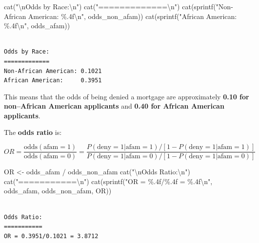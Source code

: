 \documentclass[
  12pt,
  letterpaper,
]{scrbook}
\newenvironment{Shaded}{\begin{snugshade}}{\end{snugshade}}
\newcommand{\FunctionTok}[1]{\textcolor[rgb]{0.28,0.35,0.67}{#1}}
\newcommand{\NormalTok}[1]{\textcolor[rgb]{0.00,0.23,0.31}{#1}}
\newcommand{\OtherTok}[1]{\textcolor[rgb]{0.00,0.23,0.31}{#1}}
\newcommand{\SpecialCharTok}[1]{\textcolor[rgb]{0.37,0.37,0.37}{#1}}
\newcommand{\StringTok}[1]{\textcolor[rgb]{0.13,0.47,0.30}{#1}}
\theoremstyle{definition}
\theoremstyle{plain}
\theoremstyle{remark}
\begin{document}
\begin{enumerate}
\begin{Shaded}
\begin{Highlighting}[]
\FunctionTok{cat}\NormalTok{(}\StringTok{"}\SpecialCharTok{\textbackslash{}n}\StringTok{Odds by Race:}\SpecialCharTok{\textbackslash{}n}\StringTok{"}\NormalTok{)}
\FunctionTok{cat}\NormalTok{(}\StringTok{"=============}\SpecialCharTok{\textbackslash{}n}\StringTok{"}\NormalTok{)}
\FunctionTok{cat}\NormalTok{(}\FunctionTok{sprintf}\NormalTok{(}\StringTok{"Non{-}African American: \%.4f}\SpecialCharTok{\textbackslash{}n}\StringTok{"}\NormalTok{, odds\_non\_afam))}
\FunctionTok{cat}\NormalTok{(}\FunctionTok{sprintf}\NormalTok{(}\StringTok{"African American:     \%.4f}\SpecialCharTok{\textbackslash{}n}\StringTok{"}\NormalTok{, odds\_afam))}
\end{Highlighting}
\end{Shaded}

\begin{verbatim}

Odds by Race:
=============
Non-African American: 0.1021
African American:     0.3951
\end{verbatim}

  This means that the odds of being denied a mortgage are approximately
  \textbf{0.10 for non--African American applicants} and \textbf{0.40
  for African American applicants}.

  The {\textbf{odds ratio}} is:

  \[
  OR = \frac{\text{odds}(\text{afam}=1)}{\text{odds}(\text{afam}=0)} = \frac{P(\text{deny}=1|\text{afam}=1)/[1-P(\text{deny}=1|\text{afam}=1)]}{P(\text{deny}=1|\text{afam}=0)/[1-P(\text{deny}=1|\text{afam}=0)]}
  \]

\begin{Shaded}
\begin{Highlighting}[]
\NormalTok{OR }\OtherTok{\textless{}{-}}\NormalTok{ odds\_afam }\SpecialCharTok{/}\NormalTok{ odds\_non\_afam}
\FunctionTok{cat}\NormalTok{(}\StringTok{"}\SpecialCharTok{\textbackslash{}n}\StringTok{Odds Ratio:}\SpecialCharTok{\textbackslash{}n}\StringTok{"}\NormalTok{)}
\FunctionTok{cat}\NormalTok{(}\StringTok{"===========}\SpecialCharTok{\textbackslash{}n}\StringTok{"}\NormalTok{)}
\FunctionTok{cat}\NormalTok{(}\FunctionTok{sprintf}\NormalTok{(}\StringTok{"OR = \%.4f/\%.4f = \%.4f}\SpecialCharTok{\textbackslash{}n}\StringTok{"}\NormalTok{, odds\_afam, odds\_non\_afam, OR))}
\end{Highlighting}
\end{Shaded}

\begin{verbatim}

Odds Ratio:
===========
OR = 0.3951/0.1021 = 3.8712
\end{verbatim}


\end{enumerate}
\end{document}
